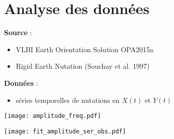 \section{Analyse des données}

\begin{frame}
\textbf{Source} :\\
	\begin{itemize}
		\item VLBI Earth Orientation Solution OPA2015a	
		\item Rigid Earth Nutation (Souchay et al. 1997)
	\end{itemize}
\textbf{Données} :
	\begin{itemize}
	\item séries temporelles de nutations en $X(t)$ et $Y(t)$
	\end{itemize}
	\vfill
\end{frame}

\begin{frame}
	\begin{center}
		\texttt{[image: amplitude\_freq.pdf]}
	\end{center}
\end{frame}

\begin{frame}
\end{frame}


\begin{frame}
	\begin{center}
		\texttt{[image: fit\_amplitude\_ser\_obs.pdf]}
	\end{center} 
\end{frame}

